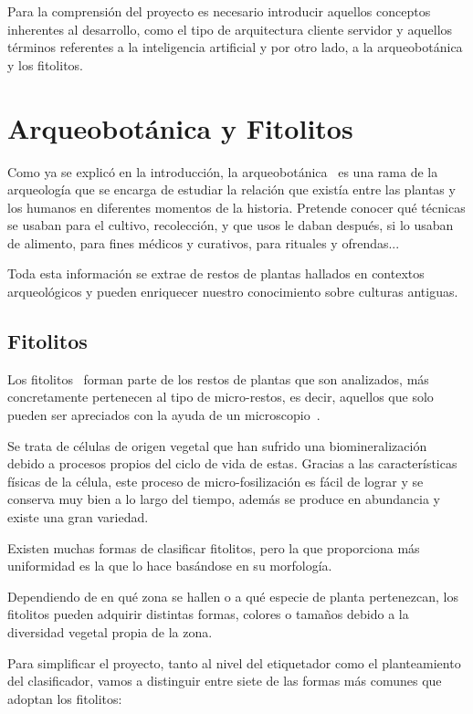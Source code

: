 
Para la comprensión del proyecto es necesario introducir aquellos conceptos inherentes al desarrollo, como el tipo de arquitectura cliente servidor y aquellos términos referentes a la inteligencia artificial y por otro lado, a la arqueobotánica y los fitolitos.

\section{Arqueobotánica y Fitolitos}
Como ya se explicó en la introducción, la arqueobotánica~\cite{archeo} es una rama de la arqueología que se encarga de estudiar la relación que existía entre las plantas y los humanos en diferentes momentos de la historia. Pretende conocer qué técnicas se usaban para el cultivo, recolección, y que usos le daban después, si lo usaban de alimento, para fines médicos y curativos, para rituales y ofrendas...

Toda esta información se extrae de restos de plantas hallados en contextos arqueológicos y pueden enriquecer nuestro conocimiento sobre culturas antiguas.

\subsection{Fitolitos}
Los fitolitos~\cite{fitolito} forman parte de los restos de plantas que son analizados, más concretamente pertenecen al tipo de micro-restos, es decir, aquellos que solo pueden ser apreciados con la ayuda de un microscopio~\cite{fito}.

Se trata de células de origen vegetal que han sufrido una biomineralización debido a procesos propios del ciclo de vida de estas. Gracias a las características físicas de la célula, este proceso de micro-fosilización es fácil de lograr y se conserva muy bien a lo largo del tiempo, además se produce en abundancia y existe una gran variedad.

Existen muchas formas de clasificar fitolitos, pero la que proporciona más uniformidad es la que lo hace basándose en su morfología. 

 Dependiendo de en qué zona se hallen o a qué especie de planta pertenezcan, los fitolitos pueden adquirir distintas formas, colores o tamaños debido a la diversidad vegetal propia de la zona.

Para simplificar el proyecto, tanto al nivel del etiquetador como el planteamiento del clasificador, vamos a distinguir entre siete de las formas más comunes que adoptan los fitolitos:

